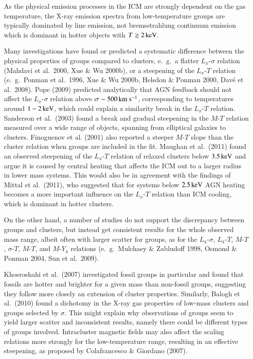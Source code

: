 \documentclass[structabstract]{aa}
\begin{document}
As the physical emission processes in the ICM are strongly dependent on the
gas temperature, the X-ray emission spectra from low-temperature groups are
typically dominated by line emission, not bremsstrahlung continuum
emission which is dominant in hotter objects with $T\gtrsim\unit[2]{keV}$.

Many investigations have found or predicted a systematic difference
between the physical properties of groups compared to clusters, e.\
g.\ a flatter $L_{x}$-$\sigma$ relation (Mahdavi et al.\ 2000, Xue \&
Wu 2000b), or a steepening of the $L_{x}$-$T$ relation (e.\ g.\
Ponman et al.\ 1996, Xue \& Wu 2000b, Helsdon \& Ponman 2000, Dav\'e
et al.\ 2008). Pope (2009) predicted analytically that AGN feedback
should not affect the $L_{x}$-$\sigma$ relation above
$\sigma\sim\unit[500]{km~s^{-1}}$, corresponding to temperatures
around $\unit[1-2]{keV}$, which could explain a similarity break in
the $L_{x}$-$T$ relation. Sanderson et al.\ (2003) found a break and
gradual steepening in the $M$-$T$ relation measured over a wide range
of objects, spanning from elliptical galaxies to clusters. Finoguenov
et al. (2001) also reported a steeper $M$-$T$ slope than the cluster
relation when groups are included in the fit. Maughan et al.\
  (2011) found an observed steepening of the $L_{x}$-$T$ relation of
  relaxed clusters below $\unit[3.5]{keV}$ and argue it is caused by
  central heating that affects the ICM out to a larger radius in lower
  mass systems. This would also be in agreement with the findings of
  Mittal et al.\ (2011), who suggested that for systems below
  $\unit[2.5]{keV}$ AGN heating becomes a more important influence on
  the $L_{x}$-$T$ relation than ICM cooling, which is dominant in
  hotter clusters.

On the other hand, a number of studies do not support the discrepancy
between groups and clusters, but instead get consistent results for
the whole observed mass range, albeit often with larger scatter for
groups, as for the $L_{\text{x}}$-$\sigma$, $L_{\text{x}}$-$T$,
$M$-$T$, $\sigma$-$T$, $M$-$T$, and $M$-$Y_{\text{x}}$ relations (e.\ g.\
Mulchaey \& Zabludoff 1998, Osmond \& Ponman 2004, Sun et al.\ 2009).

Khosroshahi et al.\ (2007) investigated fossil groups in particular
and found that fossils are hotter and brighter for a given mass than
non-fossil groups, suggesting they follow more closely an extension of
cluster properties.  Similarly, Balogh et al.\ (2010) found a
dichotomy in the X-ray gas properties of low-mass clusters and groups
selected by $\sigma$. This might explain why observations of groups
seem to yield larger scatter and inconsistent results, namely there
could be different types of groups involved. Intracluster magnetic
fields may also affect the scaling relations more strongly for the
low-temperature range, resulting in an effective steepening, as
proposed by Colafrancesco \& Giordano (2007).
\end{document}
